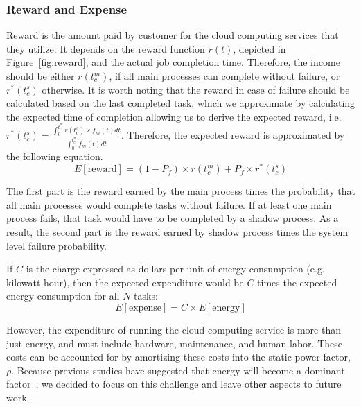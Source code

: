 \subsubsection{Reward and Expense}
Reward is the amount paid by customer for the cloud computing
services that they utilize. It depends on the reward function $r(t)$,
depicted in Figure~\ref{fig:reward}, and the actual job completion
time. Therefore, the income should be either $r(t_c^m)$, if all main
processes can complete without failure, or $r^*(t_c^s)$ otherwise. It
is worth noting that the reward in case of failure should be
calculated based on the last completed task, which we approximate by
calculating the expected time of completion allowing us to derive the
expected reward, i.e. $r^*(t_c^s)=\frac{\int_0^{t_c^m}r(t_c^s) \times
f_m(t)dt}{\int_0^{t_c^m}f_m(t)dt}$. Therefore, the expected reward is approximated by the following equation.
\begin{equation}
E[\text{reward}]= (1-P_f) \times r(t_c^m) + P_f \times r^*(t_c^s)
\end{equation}


The first part is the reward earned by the main process times the
probability that all main processes would complete tasks without
failure. If at least one main process fails, that task would have to
be completed by a shadow process. As a result, the second part is the
reward earned by shadow process times the system level failure probability.

If $C$ is the charge expressed as dollars per unit of energy consumption
(e.g. kilowatt hour), then the expected expenditure would be $C$ times
the expected energy consumption for all $N$ tasks:
\begin{equation}
E[\text{expense}] = C \times E[\text{energy}]
\label{eq:expense}
\end{equation}

However, the expenditure of running the cloud computing service is more
than just energy, and must include hardware, maintenance, and human
labor. These costs can be accounted for by amortizing these costs into the
static power factor, $\rho$. Because previous studies have
suggested
that energy will become a dominant factor~\cite{elnozahy2003energy,raghavendra2008no}, we decided to focus on this
challenge and leave other aspects to future work.

